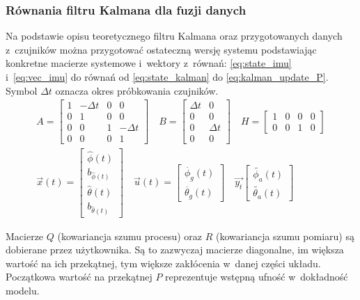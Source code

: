 \subsubsection{Równania filtru Kalmana dla fuzji danych}
Na podstawie opisu teoretycznego filtru Kalmana oraz przygotowanych danych
z~czujników można przygotować ostateczną wersję systemu podstawiając konkretne
macierze systemowe i~wektory z~równań: \ref{eq:state_imu} i~\ref{eq:vec_imu} do
równań od \ref{eq:state_kalman} do \ref{eq:kalman_update_P}.
Symbol $ \Delta t $ oznacza okres próbkowania czujników.
\begin{gather}
	A = 
	\begin{bmatrix}
		1 & -\Delta t & 0 & 0 \\
		0 & 1         & 0 & 0 \\
		0 & 0          & 1 & -\Delta t \\
		0 & 0         & 0 & 1 
	\end{bmatrix}
	\quad
	B = 
	\begin{bmatrix}
		\Delta t & 0 \\
		0        & 0 \\
		0        & \Delta t \\
		0        & 0
	\end{bmatrix}
	\quad
	H =
	\begin{bmatrix}
		1 & 0 & 0 & 0 \\
		0 & 0 & 1 & 0
	\end{bmatrix}
\label{eq:state_imu} \\
	\vec{x}\left(t\right) = 
	\begin{bmatrix}
		\hat{\phi}\left(t\right) \\
		b_{\hat{\phi}\left(t\right)} \\
		\hat{\theta}\left(t\right) \\
		b_{\hat{\theta}\left(t\right)}
	\end{bmatrix}
	\quad
	\vec{u}\left(t\right) = 
	\begin{bmatrix}
		\dot{\phi_{g}}\left(t\right) \\
		\dot{\theta_{g}}\left(t\right)
	\end{bmatrix}
	\quad
	\vec{y_t}
	\begin{bmatrix}
		\tilde{\phi_{a}}\left(t\right) \\
		\tilde{\theta_{a}}\left(t\right)
	\end{bmatrix}
\label{eq:vec_imu}
\end{gather}

Macierze $ Q $ (kowariancja szumu procesu) oraz $ R $ (kowariancja szumu
pomiaru) są dobierane przez użytkownika.
Są to zazwyczaj macierze diagonalne, im większa wartość na ich przekątnej, tym
większe zakłócenia w~danej części układu.
Początkowa wartość na przekątnej $ P $ reprezentuje wstępną ufność
w~dokładność modelu.

